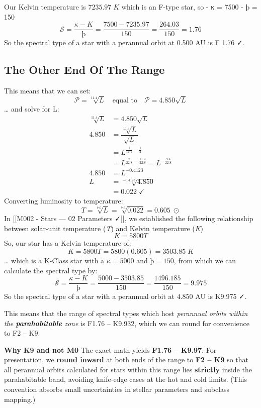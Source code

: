 \documentclass[
  letterpaper,
]{book}
\begin{document}
Our Kelvin temperature is \(7235.97\;K\) which is an F-type star, so - κ
= 7500 - þ = 150 \[
\mathcal{S} = \dfrac{\kappa - K}{þ} = \dfrac{7500 - 7235.97}{150} = \dfrac{264.03}{150} = 1.76
\] So the spectral type of a star with a perannual orbit at 0.500 AU is
F 1.76 ✓.

\subsection{The Other End Of The
Range}\label{the-other-end-of-the-range}

This means that we can set: \[
\mathcal{P} = \sqrt[11.4]{L} \quad \text{equal to} \quad \mathcal{P} = 4.850\sqrt{L}
\] \ldots{} and solve for L: \[
\begin{align}
\sqrt[11.4]{L} &= 4.850\sqrt{L} \\
4.850 &= \dfrac{\sqrt[11.4]{L}}{\sqrt{L}} \\
&= L^{\frac{1}{11.4} -{\frac{1}{2}}} \\
&= L^{\frac{2}{22.8}-\frac{11.4}{22.8}} = L^{-\frac{9.4}{22.8}} \\
4.850 &= L^{-0.4123} \\
L &= \sqrt[-0.4123]{4.850} \\
&= 0.022\; ✓
\end{align}
\] Converting luminosity to temperature: \[
T = \sqrt[7.6]{L} = \sqrt[7.6]{0.022} = 0.605\;\odot
\] In {[}{[}M002 - Stars --- 02 Parameters ✓{]}{]}, we established the
following relationship between solar-unit temperature (\emph{T}) and
Kelvin temperature (\emph{K}) \[
K = 5800T
\] So, our star has a Kelvin temperature of: \[
K = 5800T = 5800(0.605) = 3503.85\;K
\] \ldots{} which is a K-Class star with a
\(\kappa = 5000 \text{  and  } þ = 150\), from which we can calculate
the spectral type by: \[
\mathcal{S} = \dfrac{\kappa - K}{þ} = \dfrac{5000 - 3503.85}{150} = \dfrac{1496.185}{150} = 9.975
\] So the spectral type of a star with a perannual orbit at \(4.850\) AU
is K9.975 ✓.

This means that the range of spectral types which host \emph{perannual
orbits within the \textbf{parahabitable} zone} is F1.76 -- K9.932, which
we can round for convenience to F2 -- K9.

\textbf{Why K9 and not M0} The exact math yields \textbf{F1.76 --
K9.97}. For presentation, we \textbf{round inward} at both ends of the
range to \textbf{F2 -- K9} so that all perannual orbits calculated for
stars within this range lies \textbf{strictly} inside the parahabitable
band, avoiding knife‑edge cases at the hot and cold limits. (This
convention absorbs small uncertainties in stellar parameters and
subclass mapping.)
\end{document}
